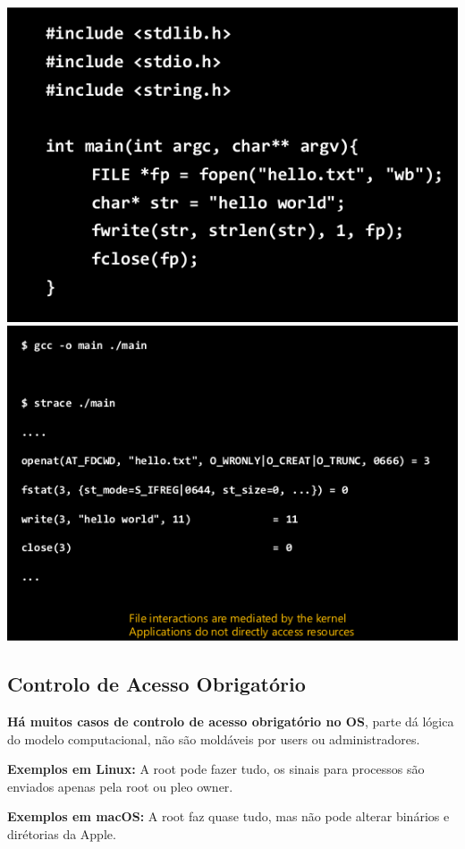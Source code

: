 \documentclass{article}
\begin{document}
\begin{center}
  \includegraphics[scale=0.3]{33}
  \includegraphics[scale=0.3]{34}
\end{center}

\subsection{Controlo de Acesso Obrigatório}

\begin{flushleft}
  \textbf{Há muitos casos de controlo de acesso obrigatório no OS},
  parte dá lógica do modelo computacional, não são moldáveis por users ou
  administradores.

  \vspace{2mm}

  \textbf{Exemplos em Linux:} A root pode fazer tudo, os sinais para processos
  são enviados apenas pela root ou pleo owner.

  \textbf{Exemplos em macOS:} A root faz quase tudo, mas não pode alterar binários
  e dirétorias da Apple.
\end{flushleft}
\end{document}

